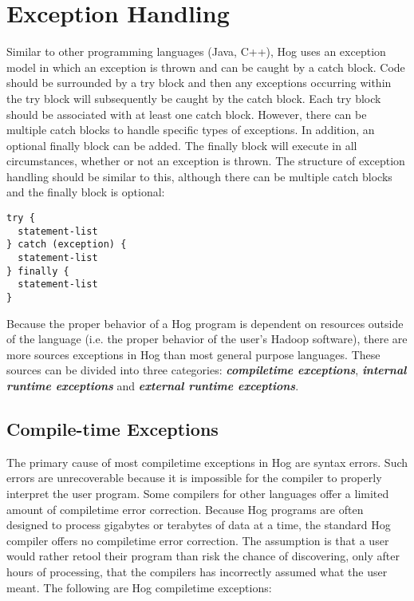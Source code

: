 \documentclass{book}
\begin{document}
\chapter{Exception Handling} %
\label{cha:exception_handling}

Similar to other programming languages (Java, C++), Hog uses an exception model in
which an exception is thrown and can be caught by a catch block. Code should be
surrounded by a try block and then any exceptions occurring within the try block
will subsequently be caught by the catch block. Each try block should be
associated with at least one catch block. However, there can be multiple catch
blocks to handle specific types of exceptions. In addition, an optional finally
block can be added. The finally block will execute in all circumstances, whether
or not an exception is thrown. The structure of exception handling should be
similar to this, although there can be multiple catch blocks and the finally block
is optional:

\begin{verbatim}
try {
  statement-list
} catch (exception) {
  statement-list
} finally {
  statement-list
}
\end{verbatim}

Because the proper behavior of a Hog program is dependent on resources outside of
the language (i.e. the proper behavior of the user’s Hadoop software), there are
more sources exceptions in Hog than most general purpose languages. These sources
can be divided into three categories: \textbf{\emph{compile­time exceptions}},
\textbf{\emph{internal run­time exceptions}} and \textbf{\emph{external run­time
exceptions}}.

\section{Compile-time Exceptions} %
\label{sec:compile_time_exceptions}

The primary cause of most compile­time exceptions in Hog are syntax errors. Such
errors are unrecoverable because it is impossible for the compiler to properly
interpret the user program. Some compilers for other languages offer a limited
amount of compile­time error correction. Because Hog programs are often designed
to process gigabytes or terabytes of data at a time, the standard Hog compiler
offers no compile­time error correction. The assumption is that a user would
rather re­tool their program than risk the chance of discovering, only after hours
of processing, that the compilers has incorrectly assumed what the user meant. The
following are Hog compile­time exceptions:
\end{document}
